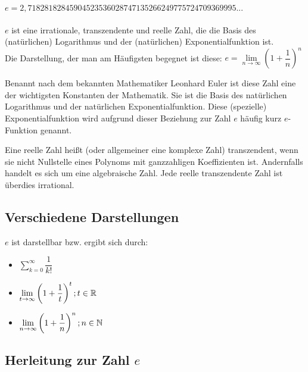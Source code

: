 \begin{Definition}
$e = 2,71828182845904523536028747135266249775724709369995...$\\
\\
$e$ ist eine irrationale, transzendente und reelle Zahl, die die Basis des (natürlichen) Logarithmus und der (natürlichen) Exponentialfunktion ist.\\
Die Darstellung, der man am Häufigsten begegnet ist diese:
$e=\lim\limits_{n\to \infty}\left(1+\dfrac{1}{n}\right)^n$
\end{Definition}
Benannt nach dem bekannten Mathematiker Leonhard Euler ist diese Zahl eine der wichtigsten Konstanten der Mathematik.
Sie ist die Basis des natürlichen Logarithmus und der natürlichen Exponentialfunktion. Diese (spezielle) Exponentialfunktion wird aufgrund dieser Beziehung zur Zahl $e$ häufig kurz $e$-Funktion genannt.
\begin{Definition}
  Eine reelle Zahl heißt (oder allgemeiner eine komplexe Zahl) transzendent,
  wenn sie nicht Nullstelle eines Polynoms mit ganzzahligen Koeffizienten ist.
  Andernfalls handelt es sich um eine algebraische Zahl. Jede reelle transzendente Zahl ist überdies irrational.
\end{Definition}

	\subsection{Verschiedene Darstellungen}

$e$ ist darstellbar bzw. ergibt sich durch:
\begin{itemize}
\item $\sum\limits_{k=0}^{\infty}\dfrac{1}{k!}$
\item $\lim\limits_{t\to \infty}\left(1+\dfrac{1}{t}\right)^t;t\in\mathbb{R}$
\item $\lim\limits_{n\to \infty}\left(1+\dfrac{1}{n}\right)^n;n\in\mathbb{N}$
\end{itemize}

	\subsection{Herleitung zur Zahl $e$}

